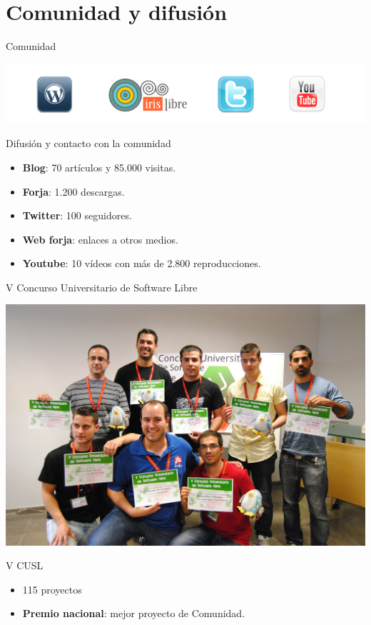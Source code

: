 \documentclass[green]{beamer}
\begin{document}
\section[Comunidad]{Comunidad y difusión}

\begin{frame}{Comunidad}

    \begin{center}
	\includegraphics[scale=0.4]{img/enlaces.png}
    \end{center}

    \begin{block}{Difusión y contacto con la comunidad}
	\begin{itemize}
	    \item \textbf{Blog}: 70 artículos y 85.000 visitas.
	    \item \textbf{Forja}: 1.200 descargas.
	    \item \textbf{Twitter}: 100 seguidores.
	    \item \textbf{Web forja}: enlaces a otros medios.
	    \item \textbf{Youtube}: 10 vídeos con más de 2.800 reproducciones.
	\end{itemize}
    \end{block}
\end{frame}

\begin{frame}{V Concurso Universitario de Software Libre}

    \begin{center}
	\includegraphics[scale=0.28]{img/vcusl.jpg}
    \end{center}

    \begin{block}{V CUSL}
	\begin{itemize}
	    \item 115 proyectos
	    \item \textbf{Premio nacional}: mejor proyecto de Comunidad.
	\end{itemize}
    \end{block}
\end{frame}
\end{document}
